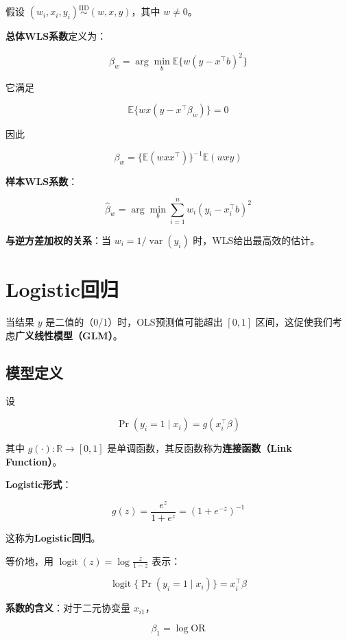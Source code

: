 假设 $(w_i, x_i, y_i) \stackrel{\mathrm{IID}}{\sim} (w, x, y)$，其中 $w \neq 0$。

\textbf{总体WLS系数}定义为：

\[
\beta_w = \arg\min_b \mathbb{E}\{w (y - x^\top b)^2\}
\tag{B.21}
\]

它满足

\[
\mathbb{E}\{w x (y - x^\top \beta_w)\} = 0
\tag{B.22}
\]

因此

\[
\beta_w = \{ \mathbb{E}(w x x^\top) \}^{-1} \mathbb{E}(w x y)
\tag{B.23}
\]

\textbf{样本WLS系数}：

\[
\hat{\beta}_w = \arg\min_b \sum_{i=1}^n w_i (y_i - x_i^\top b)^2
\tag{B.24}
\]

\textbf{与逆方差加权的关系}：当 $w_i = 1/\operatorname{var}(y_i)$ 时，WLS给出最高效的估计。


\section{Logistic回归}\label{sec:B-logistic}

当结果 $y$ 是二值的（0/1）时，OLS预测值可能超出 $[0,1]$ 区间，这促使我们考虑\textbf{广义线性模型（GLM）}。

\subsection{模型定义}\label{sec:B-logistic-model}

设

\[
\Pr(y_i = 1 \mid x_i) = g(x_i^\top \beta)
\tag{B.25}
\]

其中 $g(\cdot): \mathbb{R} \to [0,1]$ 是单调函数，其反函数称为\textbf{连接函数（Link Function）}。

\textbf{Logistic形式}：

\[
g(z) = \frac{e^z}{1+e^z} = (1+e^{-z})^{-1}
\tag{B.26}
\]

这称为\textbf{Logistic回归}。

等价地，用 $\operatorname{logit}(z) = \log \frac{z}{1-z}$ 表示：

\[
\operatorname{logit}\{\Pr(y_i = 1 \mid x_i)\} = x_i^\top \beta
\tag{B.27}
\]

\textbf{系数的含义}：对于二元协变量 $x_{i1}$，

\[
\beta_1 = \log \text{OR}
\tag{B.28}
\]

